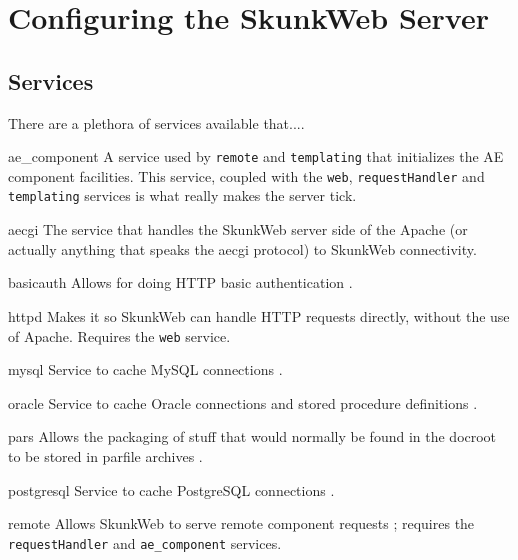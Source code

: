 \documentclass[titlepage]{manual}
\begin{document}
\chapter{Configuring the SkunkWeb Server}

\section{Services}
There are a plethora of services available that....
\begin{argdesc}
\item[ae_component] A service used by \texttt{remote} and \texttt{templating} that
initializes the AE component facilities.  This service, coupled with
the \texttt{web}, \texttt{requestHandler} and \texttt{templating}
services is what really makes the server tick.

\item[aecgi] The service that handles the SkunkWeb server side of the
Apache (or actually anything that speaks the aecgi protocol) to
SkunkWeb connectivity.

\item[basicauth]  Allows for doing HTTP basic authentication .

\item[httpd] Makes it so SkunkWeb can handle HTTP requests directly,
without the use of Apache.  Requires the \texttt{web} service.

\item[mysql] Service to cache MySQL connections
.

\item[oracle] Service to cache Oracle connections and stored procedure
definitions .

\item[pars]  Allows the packaging of stuff that would normally be found in
the docroot to be stored in parfile archives .

\item[postgresql] Service to cache PostgreSQL connections
.

\item[remote] Allows SkunkWeb to serve remote component requests
; requires the \texttt{requestHandler} 
and \texttt{ae_component} services.


\end{argdesc}
\end{document}
